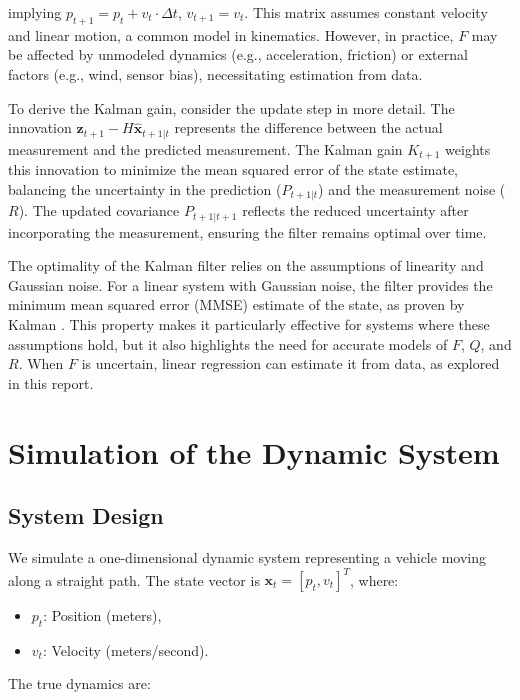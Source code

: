 \documentclass[12pt]{article}
\begin{document}
implying \( p_{t+1} = p_t + v_t \cdot \Delta t \), \( v_{t+1} = v_t \). This matrix assumes constant velocity and linear motion, a common model in kinematics. However, in practice, \( F \) may be affected by unmodeled dynamics (e.g., acceleration, friction) or external factors (e.g., wind, sensor bias), necessitating estimation from data.

To derive the Kalman gain, consider the update step in more detail. The innovation \( \mathbf{z}_{t+1} - H \hat{\mathbf{x}}_{t+1|t} \) represents the difference between the actual measurement and the predicted measurement. The Kalman gain \( K_{t+1} \) weights this innovation to minimize the mean squared error of the state estimate, balancing the uncertainty in the prediction (\( P_{t+1|t} \)) and the measurement noise (\( R \)). The updated covariance \( P_{t+1|t+1} \) reflects the reduced uncertainty after incorporating the measurement, ensuring the filter remains optimal over time.

The optimality of the Kalman filter relies on the assumptions of linearity and Gaussian noise. For a linear system with Gaussian noise, the filter provides the minimum mean squared error (MMSE) estimate of the state, as proven by Kalman \cite{kalman1960}. This property makes it particularly effective for systems where these assumptions hold, but it also highlights the need for accurate models of \( F \), \( Q \), and \( R \). When \( F \) is uncertain, linear regression can estimate it from data, as explored in this report.

\section{Simulation of the Dynamic System}
\label{sec:simulation}

\subsection{System Design}
\label{subsec:system_design}

We simulate a one-dimensional dynamic system representing a vehicle moving along a straight path. The state vector is \( \mathbf{x}_t = [p_t, v_t]^T \), where:
\begin{itemize}
    \item \( p_t \): Position (meters),
    \item \( v_t \): Velocity (meters/second).
\end{itemize}

The true dynamics are:
\end{document}
